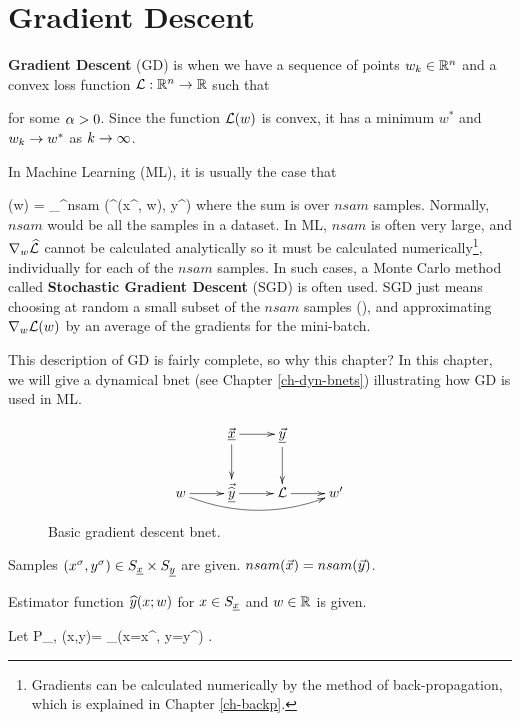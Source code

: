 \chapter{Gradient Descent}
\label{ch-gradient-descent}


{\bf Gradient Descent} (GD) is when we have a sequence of points $w_k\in{ \mathbb{R}}^n$ and a convex loss function ${\cal L}:{ \mathbb{R}}^n\rightarrow { \mathbb{R}}$ such that

\beq
{}
\label{eq-grad-descent}
\eeq
for some  $\alpha>0$.
Since the function ${\cal L}(w)$ is convex, 
it has a minimum $w^*$ and $w_k\rightarrow w^*$
as $k\rightarrow \infty$.

In Machine Learning (ML), it
is usually the case that

\beq
\call(w) = \sum_{}^{nsam}
\HAT{\call}(\haty^\s(x^\s, w), y^\s)
\eeq
where the sum is over $nsam$ samples. Normally, $nsam$ would be 
all the samples in a dataset.
In ML, $nsam$ is often very large, 
and $\nabla_w{\widehat{{\cal L}}} $ cannot
be calculated analytically so it must be calculated numerically\footnote{Gradients can 
be calculated numerically 
by the method of
back-propagation, which is explained in Chapter \ref{ch-backp}.},
individually for each of the $nsam$ samples. In such cases,
a Monte Carlo method called {\bf Stochastic Gradient Descent} (SGD)
is often used. 
SGD just means choosing at random
a small subset of the $nsam$ samples (), and
approximating $\nabla_w{\cal L}(w)$ by
an average of the gradients for the mini-batch.

This description of GD is fairly complete, so why this chapter? In this chapter, we will 
give a dynamical bnet (see Chapter \ref{ch-dyn-bnets}) illustrating how GD is used in ML.

\begin{figure}[h!]
\centering
$$\xymatrix{
&\vec{\rvx}\ar[d]\ar[r]&\ul{\vecy}
\ar[d]&\\
w\ar[r]\ar@/_1pc/[rrr]&
\vec{\HAT{\rvy}}\ar[r]&\call\ar[r]&w'
}$$
\caption{Basic gradient descent bnet.}
\label{fig-bfit}
\end{figure}


Samples 
$(x^\s, y^\s)\in S_\rvx\times S_\rvy$
are given. $nsam({\vec{x}})=nsam({\vec{y}})$.

Estimator function 
${\widehat{y}}(x; w)$
for $x\in S_\rvx$ and $w\in{ \mathbb{R}}$
is given.

Let 
\beq
P_{\rvx, \rvy}(x,y)=
\sum_\s \indi(x=x^\s, y=y^\s)
\;.
\eeq


